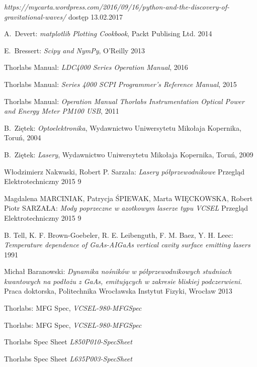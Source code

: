 \begin{thebibliography}{99}
\emph{https://mycarta.wordpress.com/2016/09/16/python-and-the-discovery-of-gravitational-waves/}
dostęp 13.02.2017

  A.~Devert:
\emph{matplotlib Plotting Cookbook},
Packt Publising Ltd. 2014

 E.~Bressert:
\emph{Scipy and NymPy},
O'Reilly 2013

 Thorlabs Manual:
\emph{LDC4000 Series Operation Manual},
2016

 Thorlabs Manual:
\emph{Series 4000 SCPI Programmer's Reference Manual},
2015

 Thorlabs Manual:
\emph{Operation Manual
Thorlabs Instrumentation Optical Power and Energy Meter PM100 USB},
2011

  B.~Ziętek:
\emph{Optoelektronika},
Wydawnictwo Uniwersytetu Mikołaja Kopernika, Toruń, 2004

  B.~Ziętek:
\emph{Lasery},
Wydawnictwo Uniwersytetu Mikołaja Kopernika, Toruń, 2009

 Włodzimierz Nakwaski, Robert P. Sarzała:
\emph{Lasery półprzewodnikowe}
 Przegląd Elektrotechniczny 2015 9

 Magdalena MARCINIAK, Patrycja
ŚPIEWAK, Marta WIĘCKOWSKA, Robert Piotr SARZAŁA:
\emph{Mody poprzeczne w azotkowym laserze typu VCSEL}
 Przegląd Elektrotechniczny 2015 9

 B. Tell, K. F. Brown-Goebeler, R. E. Leibenguth, F. M.  Baez, Y. H. Leec:
\emph{Temperature dependence of GaAs-AIGaAs vertical cavity surface emitting lasers }
1991

 Michał Baranowski:
\emph{Dynamika nośników w półprzewodnikowych
studniach kwantowych na podłożu z GaAs, emitujących w zakresie bliskiej podczerwieni.}
Praca doktorska, Politechnika Wrocławska
Instytut Fizyki, Wrocław 2013

 Thorlabs:
MFG Spec,
\emph{VCSEL-980-MFGSpec}

 Thorlabs:
MFG Spec,
\emph{VCSEL-980-MFGSpec}

 Thorlabs
Spec Sheet
\emph{L850P010-SpecSheet}

 Thorlabs
Spec Sheet
\emph{L635P003-SpecSheet}
\end{thebibliography}
